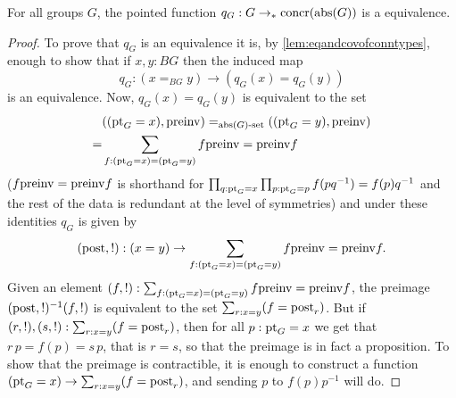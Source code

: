 \begin{lemma}
  \label{lem:Groupsareidentitytypes}%
For all groups $G$, the pointed function $q_G:G\to_*\mathrm{concr}(\mathrm{abs}(G))$ 
is a  equivalence.
\end{lemma}
\begin{proof}
  To prove that $q_G$ is an equivalence it is, by \cref{lem:eqandcovofconntypes}, enough to show that if $x,y:BG$ then the induced map
$$q_G:(x=_{BG}y)\to (q_G(x)=q_G(y))%
$$
is an equivalence.
  Now, $q_G(x)=q_G(y)$ is equivalent to the set 
\begin{align*}
  &((\mathrm{pt}_G=x),\mathrm{preinv})=_{\mathrm{abs}(G)\text{-set}}((\mathrm{pt}_G=y),\mathrm{preinv})\\
=&\sum_{f:(\mathrm{pt}_G=x)=(\mathrm{pt}_G=y)}f\mathrm{preinv}=\mathrm{preinv} f
\end{align*}
 ($f\mathrm{preinv}=\mathrm{preinv} f$ is shorthand for $\prod_{q:\mathrm{pt}_G=x}\prod_{p:\mathrm{pt}_G=p}f(pq^{-1})=f(p)q^{-1}$ and the rest of the data is redundant at the level of symmetries) and under these identities $q_G$ is given by 
$$(\mathrm{post},!):(x=y)\to \sum_{f:(\mathrm{pt}_G=x)=(\mathrm{pt}_G=y)}f\mathrm{preinv}=\mathrm{preinv} f.$$
Given an element
$(f,!):\sum_{f:(\mathrm{pt}_G=x)=(\mathrm{pt}_G=y)}f\mathrm{preinv}=\mathrm{preinv} f$, the preimage 
$(\mathrm{post},!)^{-1}(f,!)$ is equivalent to the set
$\sum_{r:x=y}(f=\mathrm{post}_r)$.  But if $(r,!),(s,!): \sum_{r:x=y}(f=\mathrm{post}_r)$, then for all $p:\mathrm{pt}_G=x$ we get that $r\,p=f(p)=s\,p$, that is $r=s$, so that the preimage is in fact a proposition.  
To show that the preimage is contractible, it is enough to construct a function $(\mathrm{pt}_G=x)\to \sum_{r:x=y}(f=\mathrm{post}_r)$, and sending $p$ to $f(p)p^{-1}$ will do.
\end{proof}


